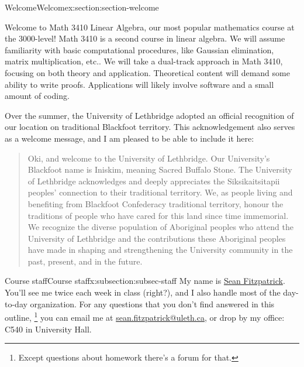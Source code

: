 \documentclass[oneside,10pt,]{article}
\begin{document}
\begin{sectionptx}{Welcome}{}{Welcome}{}{}{x:section:section-welcome}
\begin{introduction}{}%
Welcome to Math 3410 Linear Algebra, our most popular mathematics course at the 3000-level! Math 3410 is a second course in linear algebra. We will assume familiarity with basic computational procedures, like Gaussian elimination, matrix multiplication, etc.\@. We will take a dual-track approach in Math 3410, focusing on both theory and application. Theoretical content will demand some ability to write proofs. Applications will likely involve software and a small amount of coding.%
\par
Over the summer, the University of Lethbridge adopted an official recognition of our location on traditional Blackfoot territory. This acknowledgement also serves as a welcome message, and I am pleased to be able to include it here:%
\begin{quote}%
Oki, and welcome to the University of Lethbridge. Our University’s Blackfoot name is Iniskim, meaning Sacred Buffalo Stone. The University of Lethbridge acknowledges and deeply appreciates the Siksikaitsitapii peoples’ connection to their traditional territory. We, as people living and benefiting from Blackfoot Confederacy traditional territory, honour the traditions of people who have cared for this land since time immemorial. We recognize the diverse population of Aboriginal peoples who attend the University of Lethbridge and the contributions these Aboriginal peoples have made in shaping and strengthening the University community in the past, present, and in the future.%
\end{quote}
\end{introduction}%
%
%
\pagebreak
\typeout{************************************************}
\typeout{************************************************}
%
\begin{subsectionptx}{Course staff}{}{Course staff}{}{}{x:subsection:subsec-staff}
My name is \href{http://www.cs.uleth.ca/\~fitzpat}{Sean Fitzpatrick}. You'll see me twice each week in class (right?), and I also handle most of the day-to-day organization. For any questions that you don't find answered in this outline, \footnote{Except questions about homework \textendash{} there's a forum for that.\label{g:fn:idm140338499070352}} you can email me at \href{mailto:sean.fitzpatrick@uleth.ca}{sean.fitzpatrick@uleth.ca}, or drop by my office: C540 in University Hall.%
\end{subsectionptx}

\end{sectionptx}
\end{document}

